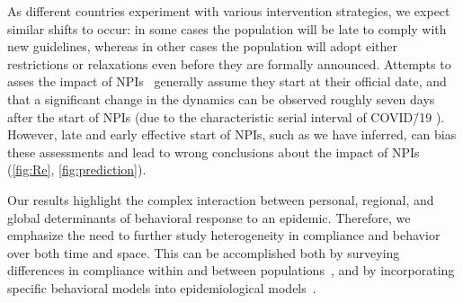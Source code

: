 \documentclass[12pt]{extarticle}
\newcommand{\covid}{COVID\=/19 }
\begin{document}
As different countries experiment with various intervention strategies, we expect similar shifts to occur: in some cases the population will be late to comply with new guidelines, whereas in other cases the population will adopt either restrictions or relaxations even before they are formally announced.
Attempts to asses the impact of NPIs~\citep{Banholzer2020,Flaxman2020} generally assume they start at their official date, and that a significant change in the dynamics can be observed roughly seven days after the start of NPIs (due to the characteristic serial interval of \covid\citep{Ali2020}).
However, late and early effective start of NPIs, such as we have inferred, can bias these assessments and lead to wrong conclusions about the impact of NPIs (\autoref{fig:Re}, \autoref{fig:prediction}).

Our results highlight the complex interaction between personal, regional, and global determinants of behavioral response to an epidemic.
Therefore, we emphasize the need to further study heterogeneity in compliance and behavior over both time and space. This can be accomplished both by surveying differences in compliance within and between populations~\citep{Atchison2020}, and by incorporating specific behavioral models into epidemiological models~\citep{Arthur2020,Fenichela2011,Walters2013}.
\end{document}
